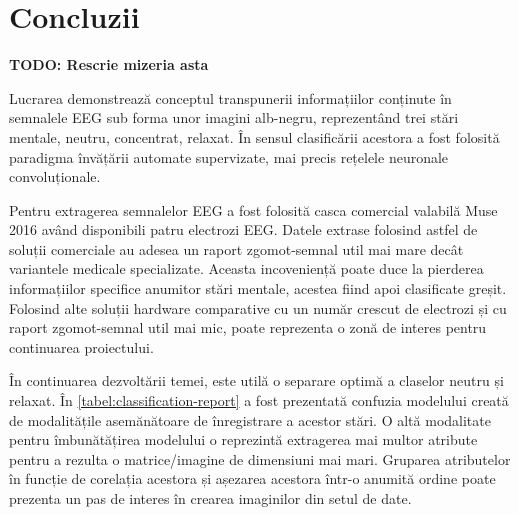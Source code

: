 \chapter{Concluzii}\label{ch:4concluzii}
\textbf{TODO: Rescrie mizeria asta}

Lucrarea demonstrează conceptul transpunerii informațiilor conținute în semnalele EEG sub forma unor imagini alb-negru, reprezentând trei stări mentale, neutru, concentrat, relaxat. În sensul clasificării acestora a fost folosită paradigma învățării automate supervizate, mai precis rețelele neuronale convoluționale.

Pentru extragerea semnalelor EEG a fost folosită casca comercial valabilă Muse 2016 având disponibili patru electrozi EEG. Datele extrase folosind  astfel de soluții comerciale au adesea un raport zgomot-semnal util mai mare decât variantele medicale specializate. Aceasta incoveniență poate duce la pierderea informațiilor specifice anumitor stări mentale, acestea fiind apoi clasificate greșit. Folosind alte soluții hardware comparative cu un număr crescut de electrozi și cu raport zgomot-semnal util mai mic, poate reprezenta o zonă de interes pentru continuarea proiectului.

În continuarea dezvoltării temei, este utilă o separare optimă a claselor neutru și relaxat. În \autoref{tabel:classification-report} a fost prezentată confuzia modelului creată de modalitățile asemănătoare de înregistrare a acestor stări. O altă modalitate pentru îmbunătățirea modelului o reprezintă extragerea mai multor atribute pentru a rezulta o matrice/imagine de dimensiuni mai mari. Gruparea atributelor în funcție de corelația acestora și așezarea acestora într-o anumită ordine poate prezenta un pas de interes în crearea imaginilor din setul de date.